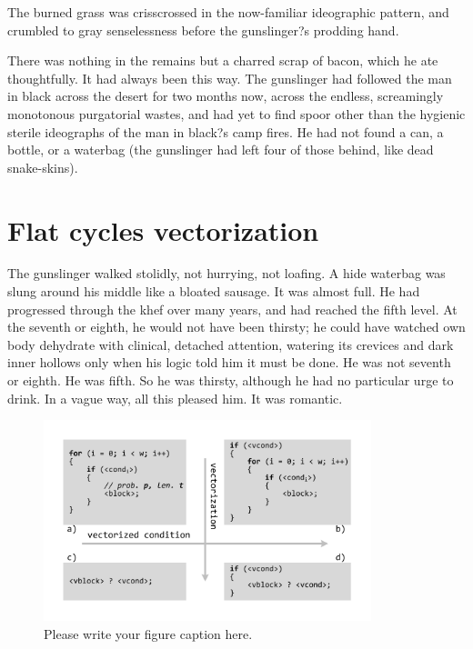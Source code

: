 \documentclass[
11pt,%
tightenlines,%
twoside,%
onecolumn,%
nofloats,%
nobibnotes,%
nofootinbib,%
superscriptaddress,%
noshowpacs,%
centertags]%
{revtex4}
\begin{document}
The burned grass was crisscrossed in the now-familiar ideographic pattern, and crumbled to gray senselessness before the gunslinger?s prodding hand. 

There was nothing in the remains but a charred scrap of bacon, which he ate thoughtfully. It had always been this way. The gunslinger had followed the man in black across the desert for two months now, across the endless, screamingly monotonous purgatorial wastes, and had yet to find spoor other than the hygienic sterile ideographs of the man in black?s camp fires. He had not found a can, a bottle, or a waterbag (the gunslinger had left four of those behind, like dead snake-skins).

\section{Flat cycles vectorization}

The gunslinger walked stolidly, not hurrying, not loafing. A hide waterbag was slung around his middle like a bloated sausage. It was almost full. He had progressed through the khef over many years, and had reached the fifth level. At the seventh or eighth, he would not have been thirsty; he could have watched own body dehydrate with clinical, detached attention, watering its crevices and dark inner hollows only when his logic told him it must be done. He was not seventh or eighth. He was fifth. So he was thirsty, although he had no particular urge to drink. In a vague way, all this pleased him. It was romantic.

\begin{figure}[h]
\setcaptionmargin{5mm}
\onelinecaptionstrue  %
\includegraphics[width=0.85\textwidth]{pics/if_vectorization.pdf}
\caption{Please write your figure caption here.}\label{fig:1}
\end{figure}
\end{document}
